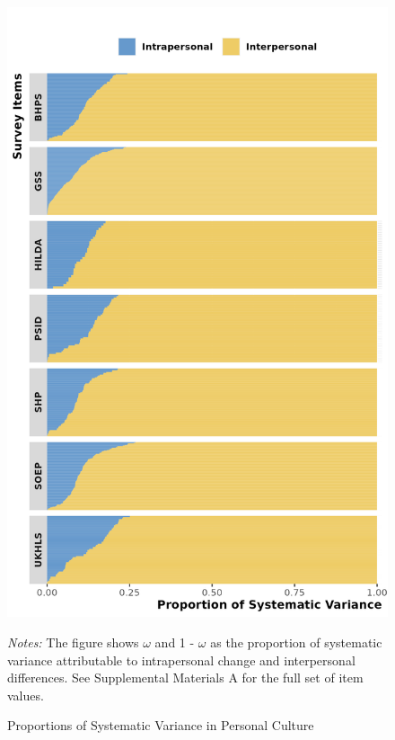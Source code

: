 \documentclass[
  12pt,
]{article}
\begin{document}
\begin{figure}[htp]
\begin{center}
\caption{Proportions of Systematic Variance in Personal Culture}

\includegraphics[width=1\linewidth]{../figures/figure_1}

\end{center}
\footnotesize{\textit{Notes:} The figure shows $\omega$ and 1 - $\omega$ as the proportion of systematic variance attributable to intrapersonal change and interpersonal differences. See Supplemental Materials A for the full set of item values.}
\end{figure}
\end{document}
